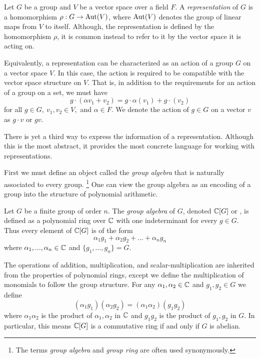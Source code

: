 \begin{definition}
    Let $G$ be a group and $V$ be a vector space over a field $F$. A \emph{representation} of $G$ is a homomorphism 
    $\rho : G \rightarrow \operatorname{Aut}(V)$, where $\operatorname{Aut}(V)$ denotes the group of linear maps from $V$ to itself. Although, 
    the representation is defined by the homomorphism $\rho$, it is common instead to refer to it by the vector 
    space it is acting on.
    
    Equivalently, a representation can be characterized as an action of a group $G$ on a vector space $V$. In this 
    case, the action is required to be compatible with the vector space structure on $V$. That is, in addition to 
    the requirements for an action of a group on a set, we must have
\[g \cdot (\alpha v_1 + v_2) = g\cdot \alpha(v_1) + g\cdot(v_2)\]
    for all $g \in G,\ v_1, v_2 \in V,$ and $\alpha \in F$.
    We denote the action of $g \in G$ on a vector $v$ as $g \cdot v$ or $gv$.
\end{definition}


    There is yet a third way to express the information of a representation. Although this is the most abstract, it 
    provides the most concrete language for working with representations.
    
    First we must define an object called the \emph{group algebra} that is naturally associated to every group.
    \footnote{The terms \emph{group algebra} and \emph{group ring} are often used synonymously.} One can view the 
    group algebra as an encoding of a group into the structure of polynomial arithmetic.


\begin{definition}
    Let $G$ be a finite group of order $n$. The \emph{group algebra} of $G$, denoted $\mathbb{C}[G]$ or \CG, is defined as 
    a polynomial ring over $\mathbb{C}$ with one indeterminant for every $g \in G$. Thus every element of $\mathbb{C}[G]$ is of the 
    form
    \[
        \alpha_1 g_1 + \alpha_2 g_2 + ... + \alpha_n g_n
    \]
    where $\alpha_1, ..., \alpha_n \in \mathbb{C}$ and $\{g_1, ..., g_n\} = G$.
    
    The operations of addition, multiplication, and scalar-multiplication are inherited from the properties of 
    polynomial rings, except we define the multiplication of monomials to follow the group structure.
    For any $\alpha_1, \alpha_2 \in \mathbb{C}$ and $g_1, g_2 \in G$ we define
    \[
        (\alpha_1g_1)(\alpha_2g_2) = (\alpha_1\alpha_2)(g_1g_2)
    \]
    where $\alpha_1\alpha_2$ is the product of $\alpha_1, \alpha_2$ in $\mathbb{C}$ and $g_1 g_2$ is the product of $g_1, 
    g_2$ in $G$. In particular, this means $\mathbb{C}[G]$ is a commutative ring if and only if $G$ is abelian.
\end{definition}


